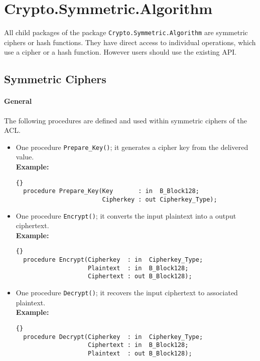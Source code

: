 \chapter{Crypto.Symmetric.Algorithm}\label{Algorithm}
All child packages of the package \texttt{Crypto.Symmetric.Algorithm} are symmetric ciphers or hash functions. They have direct access to individual operations, which use a cipher or a hash function. However users should use the existing API.
\section{Symmetric Ciphers}
\subsubsection*{General}
The following procedures are defined and used within symmetric ciphers of the ACL.
\begin{itemize} 
\item One procedure \texttt{Prepare\_Key()}; it generates a cipher key from the delivered value.\\
\textbf{Example:}
\begin{lstlisting}{}
  procedure Prepare_Key(Key       : in  B_Block128;
                        Cipherkey : out Cipherkey_Type);
\end{lstlisting}
\item One procedure \texttt{Encrypt()}; it converts the input plaintext into a output ciphertext.\\
\textbf{Example:}
\begin{lstlisting}{}
  procedure Encrypt(Cipherkey  : in  Cipherkey_Type;
                    Plaintext  : in  B_Block128;
                    Ciphertext : out B_Block128);
\end{lstlisting}
\item One procedure \texttt{Decrypt()}; it recovers the input ciphertext to associated plaintext.\\
\textbf{Example:}
\begin{lstlisting}{}
  procedure Decrypt(Cipherkey  : in  Cipherkey_Type;
                    Ciphertext : in  B_Block128;
                    Plaintext  : out B_Block128);
\end{lstlisting}
\end{itemize}
